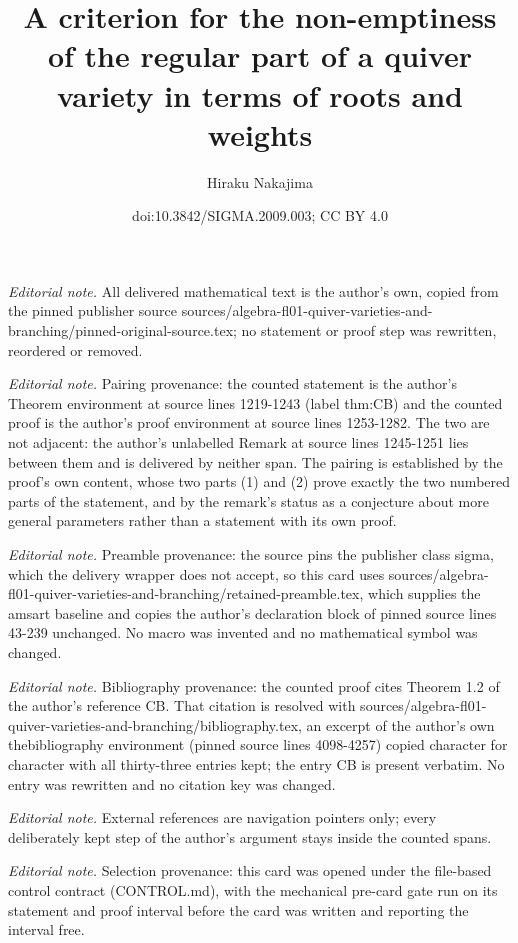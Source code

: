 \documentclass[10pt,a4paper]{amsart}
\title{A criterion for the non-emptiness of the regular part of a quiver variety in terms of roots and weights}
\author{Hiraku Nakajima}
\date{doi:10.3842/SIGMA.2009.003; CC BY 4.0}
\theoremstyle{definition}
\numberwithin{equation}{section}
\begin{document}
\maketitle
\noindent\textit{Editorial note.} All delivered mathematical text is the author's own, copied from the pinned publisher source sources/algebra-fl01-quiver-varieties-and-branching/pinned-original-source.tex; no statement or proof step was rewritten, reordered or removed.\par\medskip
\noindent\textit{Editorial note.} Pairing provenance: the counted statement is the author's Theorem environment at source lines 1219-1243 (label thm:CB) and the counted proof is the author's proof environment at source lines 1253-1282. The two are not adjacent: the author's unlabelled Remark at source lines 1245-1251 lies between them and is delivered by neither span. The pairing is established by the proof's own content, whose two parts (1) and (2) prove exactly the two numbered parts of the statement, and by the remark's status as a conjecture about more general parameters rather than a statement with its own proof.\par\medskip
\noindent\textit{Editorial note.} Preamble provenance: the source pins the publisher class sigma, which the delivery wrapper does not accept, so this card uses sources/algebra-fl01-quiver-varieties-and-branching/retained-preamble.tex, which supplies the amsart baseline and copies the author's declaration block of pinned source lines 43-239 unchanged. No macro was invented and no mathematical symbol was changed.\par\medskip
\noindent\textit{Editorial note.} Bibliography provenance: the counted proof cites Theorem 1.2 of the author's reference CB. That citation is resolved with sources/algebra-fl01-quiver-varieties-and-branching/bibliography.tex, an excerpt of the author's own thebibliography environment (pinned source lines 4098-4257) copied character for character with all thirty-three entries kept; the entry CB is present verbatim. No entry was rewritten and no citation key was changed.\par\medskip
\noindent\textit{Editorial note.} External references are navigation pointers only; every deliberately kept step of the author's argument stays inside the counted spans.\par\medskip
\noindent\textit{Editorial note.} Selection provenance: this card was opened under the file-based control contract (CONTROL.md), with the mechanical pre-card gate run on its statement and proof interval before the card was written and reporting the interval free.\par\medskip
\end{document}
